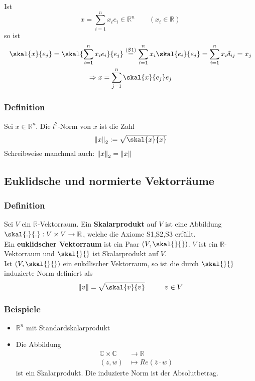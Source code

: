 Ist \[
	x=\sum_{i=1}^{n}x_ie_i \in \mathbb{R}^n \qquad (x_i \in \mathbb{R})
	\]
so ist \begin{gather*}
	\skal{x}{e_j} = \skal{\sum_{i=1}^{n}x_ie_i}{e_j} \stackrel{(S1)}{=} \sum_{i=1}^{n}x_i \skal{e_i}{e_j} = \sum^{n}_{i=1}x_i \delta_{ij} = x_j \\
	\Rightarrow x = \sum^{n}_{j=1} \skal{x}{e_j}e_j
\end{gather*}

\subsubsection[Die $l^2$-Norm]{Definition} %
\label{ssub:definition}
Sei $x \in \mathbb{R}^n$. Die $l^2$-Norm von $x$ ist die Zahl
\[
	\norm{x}_2:= \sqrt{\skal{x}{x}} 
\]
Schreibweise manchmal auch: $\norm{x}_2 = \norm{x}$

\subsection{Euklidsche und normierte Vektorräume} %
\label{sub:euklidsche_und_normierte_vektorraume}

\subsubsection[Euklidscher Vektorraum]{Definition} %
\label{ssub:definition}
Sei $ V$  ein $\mathbb{R}$-Vektorraum. Ein {\bfseries Skalarprodukt} auf $ V$  ist eine Abbildung $\skal{.}{.}:V \times V \to \mathbb{R}$, welche die Axiome S1,S2,S3 erfüllt. \\
Ein {\bfseries euklidscher Vektorraum} ist ein Paar $(V,\skal{}{})$. $ V$  ist ein $\mathbb{R}$-Vektorraum und $\skal{}{}$ ist Skalarprodukt auf $ V$. \\
Ist $(V,\skal{}{})$ ein eukdlischer Vektorraum, so ist die durch $\skal{}{}$ induzierte Norm definiert als \[
	\norm{v}=\sqrt{\skal{v}{v}} \hspace{1cm}  v \in V 
	\]

\subsubsection[Beispiel euklidscher Vektorraum]{Beispiele} %
\label{ssub:beispiele}

\begin{itemize}
	\item $\mathbb{R}^n$ mit Standardskalarprodukt
	\item Die Abbildung \begin{align*}
		 \mathbb{C} \times \mathbb{C} &\to \mathbb{R} \\
		 (z,w) &\mapsto Re(\bar z \cdot w)
		 \end{align*}
		 ist ein Skalarprodukt. Die induzierte Norm ist der Absolutbetrag.      
\end{itemize}

